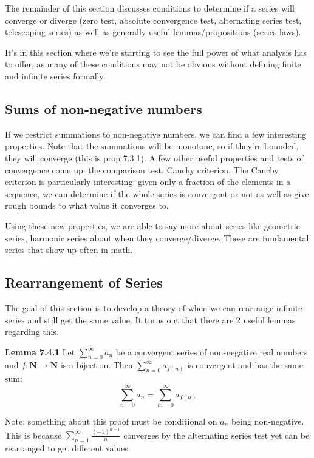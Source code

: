 \documentclass[answers,12pt]{exam}
\begin{document}
The remainder of this section discusses conditions to determine if a series will converge or diverge (zero test, absolute convergence test, alternating series test, telescoping series) as well as generally useful lemmas/propositions (series laws).

It's in this section where we're starting to see the full power of what analysis has to offer, as many of these conditions may not be obvious without defining finite and infinite series formally.

\subsection{Sums of non-negative numbers}
If we restrict summations to non-negative numbers, we can find a few interesting properties.
Note that the summations will be monotone, so if they're bounded, they will converge (this is prop 7.3.1).
A few other useful properties and tests of convergence come up: the comparison test, Cauchy criterion.
The Cauchy criterion is particularly interesting: given only a fraction of the elements in a sequence, we can determine if the whole series is convergent or not as well as give rough bounds to what value it converges to.

Using these new properties, we are able to say more about series like geometric series, harmonic series about when they converge/diverge.
These are fundamental series that show up often in math.

\subsection{Rearrangement of Series}
The goal of this section is to develop a theory of when we can rearrange infinite series and still get the same value.
It turns out that there are 2 useful lemmas regarding this.

\textbf{Lemma 7.4.1}
Let $\sum_{n=0}^{\infty} a_n$ be a convergent series of non-negative real numbers and $f: \mathbf{N} \to \mathbf{N}$ is a bijection.
Then $\sum_{n=0}^{\infty} a_{f(n)}$ is convergent and has the same sum:
\[
    \sum_{n=0}^{\infty} a_n = \sum_{m=0}^{\infty} a_{f(n)}
\]

Note: something about this proof must be conditional on $a_n$ being non-negative.
This is because $\sum_{n=1}^{\infty} \frac{{(-1)}^{n+1}}{n}$ converges by the alternating series test yet can be rearranged to get different values.
\end{document}
